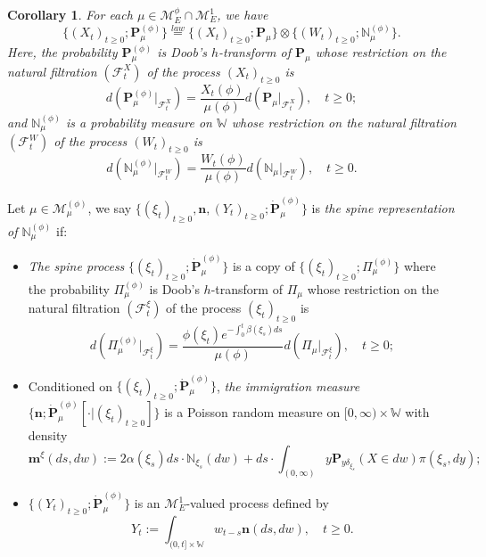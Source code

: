 \documentclass[12pt, a4paper]{amsart}
\newtheorem{cro}[thm]{Corollary}
\theoremstyle{definition}
\numberwithin{equation}{section}
\begin{document}
\begin{cro}
	For each $\mu \in \mathcal M_E^\phi \cap \mathcal M_E^1$, we have
\[
	\{(X_t)_{t\geq 0}; \mathbf P_\mu^{(\phi)}\}
	\overset{law}{=} \{(X_t)_{t\geq 0}; \mathbf P_\mu \} \otimes \{(W_t)_{t\geq 0}; \mathbb N^{(\phi)}_\mu\}.
\]
	Here, the probability $\mathbf P_\mu^{(\phi)}$ is Doob's $h$-transform of $\mathbf P_\mu$ whose restriction on the natural filtration $(\mathscr F_t^X)$ of the process $(X_t)_{t\geq 0}$ is 
\[
	d ( \mathbf P_\mu^{(\phi)}|_{\mathscr F_t^X}) = \frac{X_t(\phi)}{ \mu(\phi)} d(\mathbf P_\mu|_{\mathscr F_t^X}),
	\quad t\geq 0;
\]
	and $\mathbb N_\mu^{(\phi)}$ is a probability measure on $\mathbb W$ whose restriction on the natural filtration $(\mathscr F_t^W)$ of the process $(W_t)_{t\geq 0}$ is 
\[
	d(\mathbb N_\mu^{(\phi)} |_{\mathscr F^W_t}  )
	= \frac{W_t(\phi)}{\mu(\phi)} d(\mathbb N_\mu |_{\mathscr F^W_t}  ),
	\quad t\geq 0.
\]
\end{cro}

	Let $\mu \in \mathcal M^{(\phi)}_\mu$, we say 
	$\{(\xi_t)_{t\geq 0}, \mathbf n, (Y_t)_{ t\geq 0}; \dot {\mathbf P}^{(\phi)}_\mu\}$
	is \emph{the spine representation of $\mathbb N^{(\phi)}_\mu$}  if:
\begin{itemize}
\item
	\emph{The spine process} $\{(\xi_t)_{t\geq 0}; \dot{\mathbf P}^{(\phi)}_\mu\}$ is a copy of $\{(\xi_t)_{t\geq 0}; \Pi^{(\phi)}_{\mu}\}$ where the probability $\Pi_{\mu}^{(\phi)}$ is Doob's $h$-transform of $\Pi_\mu$ whose restriction on the natural filtration $(\mathscr F_t^\xi)$ of the process $(\xi_t)_{t\geq 0}$ is 
\[
	d(\Pi_{\mu}^{(\phi)} |_{\mathscr F_t^\xi})
	= \frac{\phi(\xi_t)e^{-\int_0^t \beta(\xi_s)ds}}{\mu(\phi)} d(\Pi_{\mu} |_{\mathscr F_t^\xi}),
	\quad t\geq 0;
\]
\item
	Conditioned on $\{(\xi_t)_{t\geq 0}; \dot{\mathbf P}^{(\phi)}_\mu\}$, \emph{the immigration measure} $\{\mathbf n; \dot{\mathbf P}^{(\phi)}_\mu[\cdot |(\xi_t)_{t\geq 0}]\}$ is a Poisson random measure on $[0,\infty ) \times \mathbb W$ with 
    density
\[\label{eq:meanMeasImmigr}
	\mathbf m^\xi(ds,dw)
	:= 2 \alpha(\xi_s) ds \cdot \mathbb N_{\xi_s}(dw) + ds \cdot \int_{(0,\infty)} y \mathbf P_{y\delta_{\xi_s}}(X\in dw) \pi(\xi_s,dy);
\]
\item
	$\{(Y_t)_{t\geq 0}; \dot{\mathbf P}^{(\phi)}_\mu\}$ is an $\mathcal M^1_E$-valued process defined by
\[\label{eq:defSpinImmigr}
	Y_t
	:= \int_{(0,t] \times \mathbb W} w_{t-s} \mathbf n(ds,dw),
	\quad t\geq 0.
\]
\end{itemize}
\end{document}
